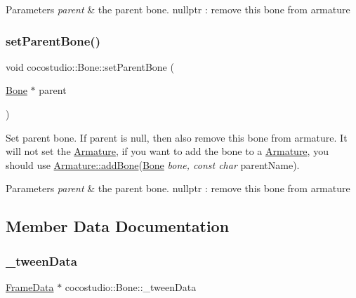 \begin{DoxyParams}{Parameters}
{\em parent} & the parent bone. nullptr \+: remove this bone from armature \\
\hline
\end{DoxyParams}
\mbox{\label{classcocostudio_1_1Bone_ac68dd00133f611910e2ceb5bc19a1618}} 
\subsubsection{\texorpdfstring{set\+Parent\+Bone()}{setParentBone()}\hspace{0.1cm}{\footnotesize\ttfamily [2/2]}}
{\footnotesize\ttfamily void cocostudio\+::\+Bone\+::set\+Parent\+Bone (\begin{DoxyParamCaption}\item[{\hyperlink{classcocostudio_1_1Bone}{Bone} $\ast$}]{parent }\end{DoxyParamCaption})}

Set parent bone. If parent is null, then also remove this bone from armature. It will not set the \hyperlink{classcocostudio_1_1Armature}{Armature}, if you want to add the bone to a \hyperlink{classcocostudio_1_1Armature}{Armature}, you should use \hyperlink{classcocostudio_1_1Armature_af7a204c1c43c67de2c29c9d3dff58c55}{Armature\+::add\+Bone}(\hyperlink{classcocostudio_1_1Bone}{Bone} {\itshape bone, const char} parent\+Name).


\begin{DoxyParams}{Parameters}
{\em parent} & the parent bone. nullptr \+: remove this bone from armature \\
\hline
\end{DoxyParams}


\subsection{Member Data Documentation}
\mbox{\label{classcocostudio_1_1Bone_af7039ac382baa763ca311c103d3a386f}} 
\subsubsection{\texorpdfstring{\+\_\+tween\+Data}{\_tweenData}}
{\footnotesize\ttfamily \hyperlink{classcocostudio_1_1FrameData}{Frame\+Data} $\ast$ cocostudio\+::\+Bone\+::\+\_\+tween\+Data\hspace{0.3cm}{\ttfamily [protected]}}




